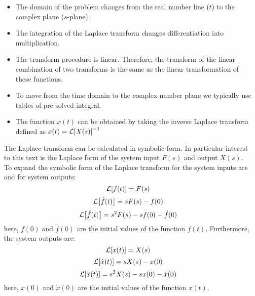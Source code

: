 \documentclass[12pt,letter]{article}
\begin{document}
\begin{review}
	\begin{itemize}
		\item The domain of the problem changes from the real number line ($t$) to the complex plane ($s$-plane).
		\item The integration of the Laplace transform changes differentiation into multiplication.
		\item The transform procedure is linear. Therefore, the transform of the linear combination of two transforms is the same as the linear transformation of these functions. 
		\item To move from the time domain to the complex number plane we typically use tables of pre-solved integral. 
		\item The function $x(t)$ can be obtained by taking the inverse Laplace transform defined as $x(t) = \mathcal{L}{\left[X(s)\right]}^{-1}$
	\end{itemize}
	
	The Laplace transform can be calculated in symbolic form. In particular interest to this text is the Laplace form of the system input $F(s)$ and output $X(s)$. To expand the symbolic form of the Laplace transform for the system inputs are 
	and for system outputs:
	\begin{equation}
		\label{eq:laplace_f}
		\mathcal{L}{\left[f(t)\right]} = F(s)
	\end{equation}		
	\begin{equation}
		\label{eq:laplace_f'}
		\mathcal{L}{\left[\dot{f}(t)\right]} = sF(s)-f(0)
	\end{equation}	
	\begin{equation}
		\label{eq:laplace_f''}
		\mathcal{L}{\left[\ddot{f}(t)\right]} = s^2F(s)-sf(0) - \dot{f}(0)
	\end{equation}	
	here, $f(0)$ and $\dot{f}(0)$ are the initial values of the function $f(t)$.  Furthermore, the system outputs are:
	\begin{equation}
		\label{eq:laplace_x}
		\mathcal{L}{\left[x(t)\right]} = X(s)
	\end{equation}		
	\begin{equation}
		\label{eq:laplace_x'}
		\mathcal{L}{\left[\dot{x}(t)\right]} = sX(s)-x(0)
	\end{equation}	
	\begin{equation}
		\label{eq:laplace_x''}
		\mathcal{L}{\left[\ddot{x}(t)\right]} = s^2X(s)-sx(0) - \dot{x}(0)
	\end{equation}	
	here, $x(0)$ and $\dot{x}(0)$ are the initial values of the function $x(t)$. 		
	
\end{review}
\end{document}
